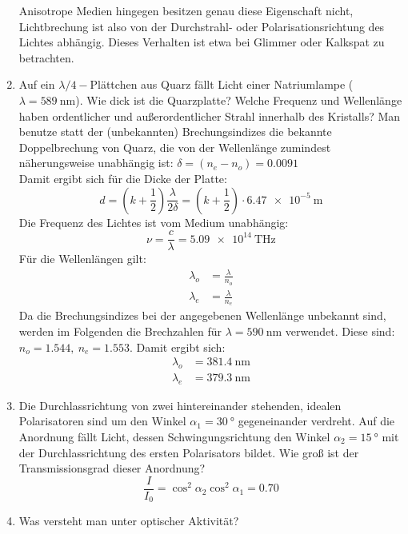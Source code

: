 \begin{enumerate}
		Anisotrope Medien hingegen besitzen genau diese Eigenschaft nicht, Lichtbrechung ist also von der Durchstrahl- oder Polarisationsrichtung des Lichtes abhängig. Dieses Verhalten ist etwa bei Glimmer oder Kalkspat zu betrachten.
	\item Auf ein $\lambda/4-$Plättchen aus Quarz fällt Licht einer Natriumlampe ($\lambda=\SI{589}{\nano\meter}$). Wie dick ist die Quarzplatte? Welche Frequenz und Wellenlänge haben ordentlicher und außerordentlicher Strahl innerhalb des Kristalls?
		\subitem Man benutze statt der (unbekannten) Brechungsindizes die bekannte Doppelbrechung von Quarz, die von der Wellenlänge zumindest näherungsweise unabhängig ist: $\delta=(n_e-n_o)=0.0091$\\
		Damit ergibt sich für die Dicke der Platte:
		\begin{displaymath}
			d=(k+\frac{1}{2})\frac{\lambda}{2\delta}=(k+\frac{1}{2})\cdot\SI{6.47e-5}{\meter}
		\end{displaymath}
		Die Frequenz des Lichtes ist vom Medium unabhängig:
		\begin{displaymath}
			\nu=\frac{c}{\lambda}=\SI{5.09e14}{\tera\hertz}
		\end{displaymath}
		Für die Wellenlängen gilt:
		\begin{align*}
			\lambda_o&=\frac{\lambda}{n_o}\\
			\lambda_e&=\frac{\lambda}{n_e}
		\end{align*}
		Da die Brechungsindizes bei der angegebenen Wellenlänge unbekannt sind, werden im Folgenden die Brechzahlen für $\lambda=\SI{590}{\nano\meter}$ verwendet. Diese sind: $n_o=1.544,~n_e=1.553$. Damit ergibt sich:
		\begin{align*}
			\lambda_o&=\SI{381.4}{\nano\meter}\\
			\lambda_e&=\SI{379.3}{\nano\meter}
		\end{align*}
	\item Die Durchlassrichtung von zwei hintereinander stehenden, idealen Polarisatoren sind um den Winkel $\alpha_1=\SI{30}{\degree}$ gegeneinander verdreht. Auf die Anordnung fällt Licht, dessen Schwingungsrichtung den Winkel $\alpha_2=\SI{15}{\degree}$ mit der Durchlassrichtung des ersten Polarisators bildet. Wie groß ist der Transmissionsgrad dieser Anordnung?
		\subitem \begin{displaymath}
			\frac{I}{I_0}=\cos^2\alpha_2\cos^2\alpha_1=0.70
		\end{displaymath}
	\item Was versteht man unter optischer Aktivität?

\end{enumerate}
